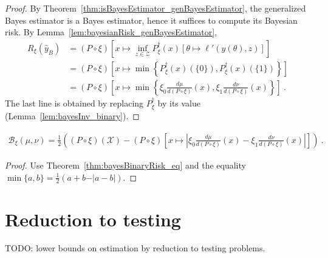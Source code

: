 \begin{proof}%
{}
By Theorem~\ref{thm:isBayesEstimator_genBayesEstimator}, the generalized Bayes estimator is a Bayes estimator, hence it suffices to compute its Bayesian risk.
By Lemma~\ref{lem:bayesianRisk_genBayesEstimator},
\begin{align*}
R_\xi(\hat{y}_B)
&= (P \circ \xi)\left[x \mapsto \inf_{z \in \mathcal Z} P_\xi^\dagger(x) \left[\theta \mapsto \ell'(y(\theta), z)\right]\right]
\\
&= (P \circ \xi)\left[x \mapsto \min \left\{P_\xi^\dagger(x)(\{0\}), P_\xi^\dagger(x)(\{1\})\right\}\right]
\\
&= (P \circ \xi)\left[x \mapsto \min \left\{\xi_0\frac{d \mu}{d(P \circ \xi)}(x), \xi_1\frac{d \nu}{d(P \circ \xi)}(x)\right\}\right]
\: .
\end{align*}
The last line is obtained by replacing $P_\xi^\dagger$ by its value (Lemma~\ref{lem:bayesInv_binary}).
\end{proof}

\begin{corollary}
  \label{cor:bayesBinaryRisk_eq_abs}
  \begin{align*}
  \mathcal B_\xi(\mu, \nu) = \frac{1}{2}\left((P \circ \xi)(\mathcal X) -  (P \circ \xi)\left[x \mapsto \left\vert \xi_0\frac{d \mu}{d(P \circ \xi)}(x) - \xi_1\frac{d \nu}{d(P \circ \xi)}(x)\right\vert\right] \right)
  \: .
  \end{align*}
\end{corollary}

\begin{proof}%
{}
Use Theorem~\ref{thm:bayesBinaryRisk_eq} and the equality $\min\{a,b\} = \frac{1}{2}(a + b - \vert a - b \vert)$.
\end{proof}



\section{Reduction to testing}

TODO: lower bounds on estimation by reduction to testing problems.